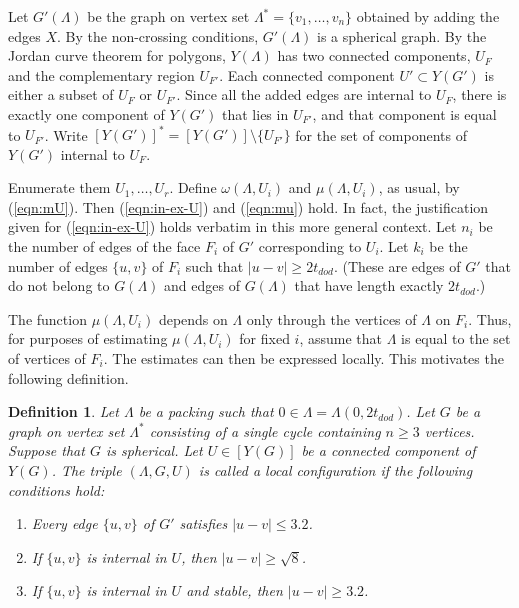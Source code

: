 \documentclass{article} %
\newtheorem{definition}[lemma]{Definition}
\begin{document}
Let $G'(\Lambda)$ be the graph on vertex set $\Lambda^*=\{v_1,\ldots,v_n\}$ obtained by adding the edges $X$.  By the non-crossing
conditions, $G'(\Lambda)$ is a spherical graph.  
By the Jordan curve theorem for polygons, $Y(\Lambda)$ has two connected 
components,
$U_F$ and the complementary region $U_{F'}$.
Each
connected component $U'\subset Y(G')$ is either a subset of $U_F$ or $U_{F'}$.
Since all the added edges are internal to $U_F$, there is exactly
one component of $Y(G')$ that lies in $U_{F'}$, and that component
is equal to $U_{F'}$.  Write $[Y(G')]^* = [Y(G')]\setminus\{U_{F'}\}$
for the set of components of $Y(G')$ internal to $U_F$.

Enumerate them $U_1,\ldots,U_r$.  Define $\omega(\Lambda,U_i)$ and
$\mu(\Lambda,U_i)$, as usual,  by (\ref{eqn:mU}).  Then
(\ref{eqn:in-ex-U}) and (\ref{eqn:mu}) hold.  In fact, the justification
given for (\ref{eqn:in-ex-U}) holds verbatim in this more general
context. Let $n_i$ be the number of edges of the face
$F_i$ of $G'$ corresponding to $U_i$.  Let $k_i$ be the number of edges
$\{u,v\}$
of $F_i$ such that $|u-v|\ge 2t_{dod}$. (These are edges of $G'$ that do not
belong to $G(\Lambda)$ and edges of $G(\Lambda)$ that have
length exactly $2t_{dod}$.)  

The function $\mu(\Lambda,U_i)$ depends on $\Lambda$ only through
the vertices of $\Lambda$ on $F_i$.  Thus, for purposes of estimating
$\mu(\Lambda,U_i)$ for fixed $i$,  assume that $\Lambda$
is equal to the set of vertices of $F_i$.  The estimates can then
be expressed locally.
   This motivates the following definition.

\begin{definition}
Let $\Lambda$ be a packing such that $0\in\Lambda=\Lambda(0,2t_{dod})$.  
Let $G$ be a graph on vertex set $\Lambda^*$ 
consisting
of a single cycle containing $n\ge 3$ vertices.  
Suppose that $G$ is spherical. 
Let $U\in [Y(G)]$ be a connected component of $Y(G)$.  
The triple $(\Lambda,G,U)$ is called a {\it local configuration} if the
following conditions hold:
\begin{enumerate}
\item Every edge $\{u,v\}$ of $G'$ satisfies $|u-v|\le 3.2$.
\item If
$\{u,v\}$ is internal in  $U$, then $|u-v|\ge \sqrt8$.
\item If $\{u,v\}$ is internal in $U$ and stable,
then $|u-v|\ge 3.2$.
\end{enumerate}
\end{definition}
\end{document}
